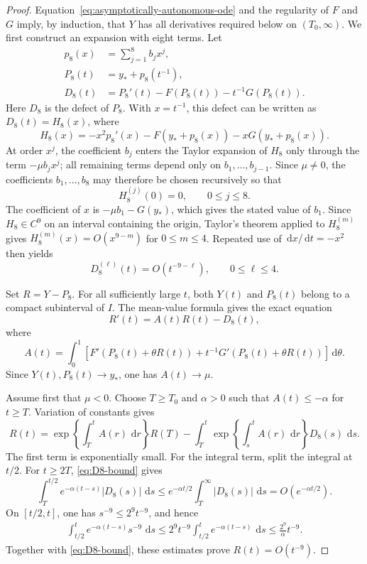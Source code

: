 \documentclass[12pt,preprint]{amsart}
\numberwithin{equation}{section}
\theoremstyle{plain}
\theoremstyle{definition}
\newcommand{\dd}{\,\mathrm d}
\begin{document}
\begin{proof}
Equation~\eqref{eq:asymptotically-autonomous-ode} and the regularity of
$F$ and $G$ imply, by induction, that $Y$ has all derivatives required below
on $(T_0,\infty)$.  We first construct an expansion with eight terms.  Let
\[
\begin{aligned}
 p_8(x)&=\sum_{j=1}^8 b_jx^j,\\
 P_8(t)&=y_*+p_8(t^{-1}),\\
 D_8(t)&=P_8'(t)-F(P_8(t))-t^{-1}G(P_8(t)).
\end{aligned}
\]
Here $D_8$ is the defect of $P_8$.
With $x=t^{-1}$, this defect can be written as $D_8(t)=H_8(x)$, where
\[
 H_8(x)=-x^2p_8'(x)-F(y_*+p_8(x))-xG(y_*+p_8(x)).
\]
At order $x^j$, the coefficient $b_j$ enters the Taylor expansion of
$H_8$ only through the term $-\mu b_jx^j$; all remaining terms depend only
on $b_1,\ldots,b_{j-1}$.  Since $\mu\ne0$, the coefficients
$b_1,\ldots,b_8$ may therefore be chosen recursively so that
\[
 H_8^{(j)}(0)=0,
 \qquad 0\le j\le8.
\]
The coefficient of $x$ is $-\mu b_1-G(y_*)$, which gives the stated value of
$b_1$.  Since $H_8\in C^9$ on an interval containing the origin, Taylor's
theorem applied to $H_8^{(m)}$ gives
$H_8^{(m)}(x)=O(x^{9-m})$ for $0\le m\le4$.  Repeated use of
$\dd x/\dd t=-x^2$ then yields
\begin{equation}
 D_8^{(\ell)}(t)=O(t^{-9-\ell}),
 \qquad 0\le\ell\le4.
 \label{eq:D8-bound}
\end{equation}

Set $R=Y-P_8$.  For all sufficiently large $t$, both $Y(t)$ and $P_8(t)$
belong to a compact subinterval of $I$.  The mean-value formula gives the
exact equation
\begin{equation}
 R'(t)=A(t)R(t)-D_8(t),
 \label{eq:R-linear-equation}
\end{equation}
where
\[
 A(t)=\int_0^1\left[
 F'(P_8(t)+\theta R(t))
 +t^{-1}G'(P_8(t)+\theta R(t))
 \right]\dd\theta.
\]
Since $Y(t),P_8(t)\to y_*$, one has $A(t)\to\mu$.

Assume first that $\mu<0$.  Choose $T\ge T_0$ and $\alpha>0$ such that
$A(t)\le-\alpha$ for $t\ge T$.  Variation of constants gives
\begin{equation*}
 R(t)=\exp\left\{\int_T^tA(r)\,\dd r\right\}R(T)
 -\int_T^t\exp\left\{\int_s^tA(r)\,\dd r\right\}D_8(s)\,\dd s.
\end{equation*}
The first term is exponentially small.  For the integral term, split the
integral at $t/2$.  For $t\ge2T$, \eqref{eq:D8-bound} gives
\[
 \int_T^{t/2}e^{-\alpha(t-s)}|D_8(s)|\,\dd s
 \le e^{-\alpha t/2}\int_T^\infty|D_8(s)|\,\dd s
 =O(e^{-\alpha t/2}).
\]
On $[t/2,t]$, one has $s^{-9}\le2^9t^{-9}$, and hence
\[
\begin{aligned}
 \int_{t/2}^t e^{-\alpha(t-s)}s^{-9}\,\dd s
 \le 2^9t^{-9}
   \int_{t/2}^t e^{-\alpha(t-s)}\,\dd s
 \le \frac{2^9}{\alpha}t^{-9}.
\end{aligned}
\]
Together with \eqref{eq:D8-bound}, these estimates prove
$R(t)=O(t^{-9})$.


\end{proof}
\end{document}
